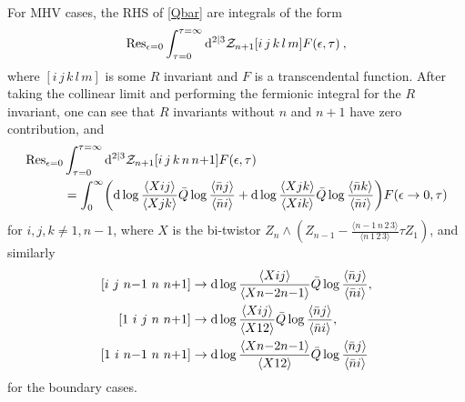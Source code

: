 \documentclass[a4paper,12pt]{article}
\begin{document}
For MHV cases, the RHS of \eqref{Qbar} are integrals of the form
\[
    \operatorname{Res}_{\epsilon=0}\int^{\tau=\infty}_{\tau=0} {\rm d}^{2|3}\mathcal{Z}_{n{+}1}[i\,j\,k\,l\,m]F(\epsilon,\tau)\:,
\]
where $[i\,j\,k\,l\,m]$ is some $R$ invariant and $F$ is a transcendental function. After taking the collinear limit and performing the fermionic integral for the $R$ invariant, one can see that $R$ invariants without $n$ and $n+1$ have zero contribution, and~\cite{CaronHuot:2011kk} 
\begin{align}\label{toqlog2}
    \operatorname{Res}_{\epsilon=0}&\int^{\tau=\infty}_{\tau=0} {\rm d}^{2|3}\mathcal{Z}_{n{+}1}[i\,j\,k\,n\,n{+}1]F(\epsilon,\tau)\nonumber\\
    &=\int^{\infty}_0\biggl({\rm d}\log\frac{\langle Xij\rangle}{\langle Xjk\rangle}\bar Q\log\frac{\langle\bar n j\rangle}{\langle\bar ni\rangle}+{\rm d}\log\frac{\langle Xjk\rangle}{\langle Xik\rangle}\bar Q\log\frac{\langle\bar n k\rangle}{\langle\bar ni\rangle}\biggr)F(\epsilon\to 0,\tau)
\end{align}
for $i,j,k\neq1,n{-}1$, where $X$ is the bi-twistor $Z_{n}\wedge (Z_{n-1}-\frac{\langle n{-}1\,n\,2\,3\rangle}{\langle n\,1\,2\,3\rangle}\tau Z_{1})$, and similarly
\begin{align}\label{toqlog3}
[i\ j\ n{-}1\ n\ n{+1}]&\to {\rm d}\log\frac{\langle Xij\rangle}{\langle X n{-}2 n{-}1\rangle}\bar Q\log \frac{\langle\bar n j\rangle}{\langle\bar ni\rangle},\nonumber\\
[1\ i\ j\ n\ n{+1}]&\to {\rm d}\log\frac{\langle Xij\rangle}{\langle X 12\rangle}\bar Q\log \frac{\langle\bar n j\rangle}{\langle\bar ni\rangle},\\
[1\ i\ n{-}1\ n\ n{+1}]&\to {\rm d}\log\frac{\langle X n{-}2 n{-}1\rangle}{\langle X12\rangle}\bar Q\log \frac{\langle\bar n j\rangle}{\langle\bar ni\rangle}\nonumber
\end{align}
for the boundary cases.
\end{document}
